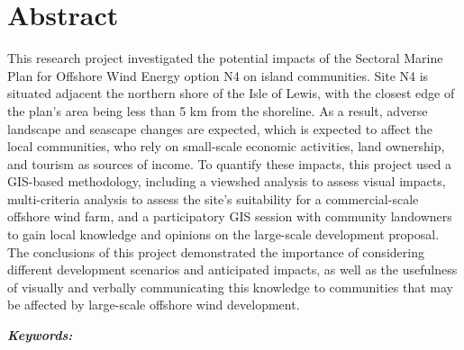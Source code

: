 \chapter*{Abstract}

This research project investigated the potential impacts of the Sectoral Marine Plan for Offshore Wind Energy option N4 on island communities. Site N4 is situated adjacent the northern shore of the Isle of Lewis, with the closest edge of the plan's area being less than 5 km from the shoreline. As a result, adverse landscape and seascape changes are expected, which is expected to affect the local communities, who rely on small-scale economic activities, land ownership, and tourism as sources of income. To quantify these impacts, this project used a GIS-based methodology, including a viewshed analysis to assess visual impacts, multi-criteria analysis to assess the site's suitability for a commercial-scale offshore wind farm, and a participatory GIS session with community landowners to gain local knowledge and opinions on the large-scale development proposal. The conclusions of this project demonstrated the importance of considering different development scenarios and anticipated impacts, as well as the usefulness of visually and verbally communicating this knowledge to communities that may be affected by large-scale offshore wind development.

\noindent\textbf{\textit{Keywords:}} \keywords
